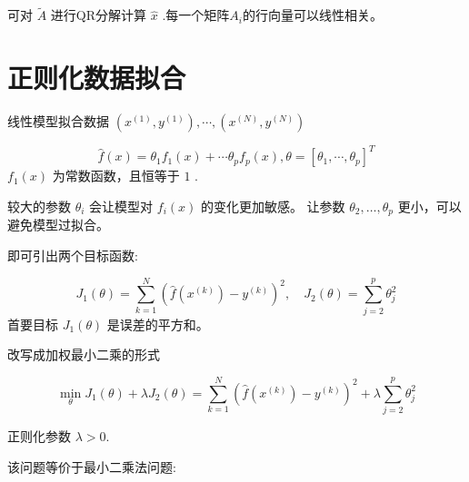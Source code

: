 可对 $ \tilde{A} $ 进行QR分解计算 $ \hat{x} $ .每一个矩阵$A_i$的行向量可以线性相关。



\section{正则化数据拟合}

\begin{problem}
    线性模型拟合数据 $ \left(x^{(1)}, y^{(1)}\right), \cdots,\left(x^{(N)}, y^{(N)}\right) $

    $$
\hat{f}(x)=\theta_{1} f_{1}(x)+\cdots \theta_{p} f_{p}(x), \theta=\left[\theta_{1}, \cdots, \theta_{p}\right]^{T}
$$
$ f_{1}(x) $ 为常数函数，且恒等于 $1$ .
\end{problem}


较大的参数 $ \theta_{i} $ 会让模型对 $ f_{i}(x) $ 的变化更加敏感。 让参数 $ \theta_{2}, \ldots, \theta_{p} $ 更小，可以避免模型过拟合。

即可引出两个目标函数:

\begin{problem}
    $$
J_{1}(\theta)=\sum_{k=1}^{N}\left(\hat{f}\left(x^{(k)}\right)-y^{(k)}\right)^{2}, \quad J_{2}(\theta)=\sum_{j=2}^{p} \theta_{j}^{2}
$$
首要目标 $ J_{1}(\theta) $ 是误差的平方和。
\end{problem}

改写成加权最小二乘的形式

\begin{problem}
    $$
\min _{\theta} J_{1}(\theta)+\lambda J_{2}(\theta)=\sum_{k=1}^{N}\left(\hat{f}\left(x^{(k)}\right)-y^{(k)}\right)^{2}+\lambda \sum_{j=2}^{p} \theta_{j}^{2}
$$

正则化参数 $ \lambda>0 $.
\end{problem}




该问题等价于最小二乘法问题:

